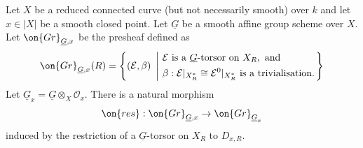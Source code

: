 \documentclass[]{pcmi}
\theoremstyle{plain}
\theoremstyle{remark}
\theoremstyle{definition}
\newcommand{\mE}{{\mathcal E}}
\newcommand{\mO}{{\mathcal O}}
\newcommand{\Gr}{{\on{Gr}}}
\begin{document}
Let $X$ be a reduced connected curve (but not necessarily smooth) over $k$ and let $x\in |X|$ be a smooth closed point. Let $\underline G$ be a smooth affine group scheme over $X$. 
Let $\Gr_{\underline G,x}$ be the presheaf defined as
\begin{equation}\label{aff glob}
\Gr_{\underline G,x}(R)=\left\{(\mE,\beta)\ \left|\ \begin{split}&\mE \mbox{ is a } \underline G\mbox{-torsor on } X_R , \mbox{ and }\\
& \beta:\mE|_{X_R^*}\cong \mE^0|_{X_R^*}\mbox{ is a trivialisation}.\end{split}\right.\right\}
\end{equation}
Let $\underline G_x=\underline G\otimes_X \mO_x$. There is a natural morphism 
$$\on{res}:\Gr_{\underline G,x}\to \Gr_{\underline G_x}$$ 
induced by the restriction of a $\underline G$-torsor on $X_R$ to $D_{x,R}$.
\end{document}
